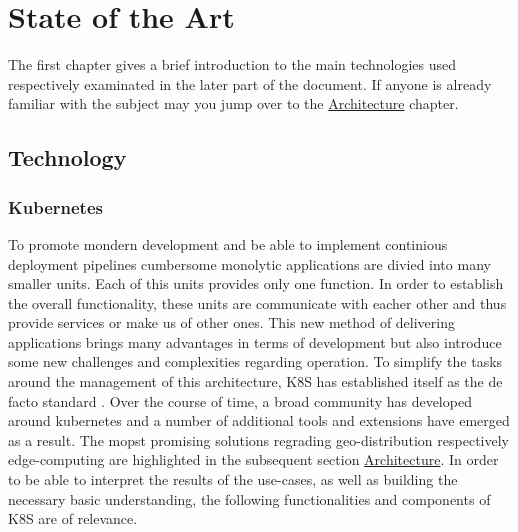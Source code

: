 \documentclass[MSC,Master,english]{twbook}%
\begin{document}
\chapter{State of the Art}
\label{chap:current}
The first chapter gives a brief introduction to the main technologies used respectively examinated in the later part of the document. If anyone is already familiar with the subject may you jump over to the \hyperref[sec:architecture]{Architecture} chapter.
\section{Technology}
\label{sec:technology}
\subsection{Kubernetes}
To promote mondern development and be able to implement continious deployment pipelines cumbersome monolytic applications are divied into many smaller units. Each of this units provides only one function. In order to establish the overall functionality, these units are communicate with eacher other and thus provide services or make us of other ones. This new method of delivering applications brings many advantages in terms of development but also introduce some new challenges and complexities regarding operation. To simplify the tasks around the management of this architecture, \ac{K8S} has established itself as the de facto standard \cite{k8ssurv}. Over the course of time, a broad community has developed around kubernetes and a number of additional tools and extensions have emerged as a result. The mopst promising solutions regrading geo-distribution respectively edge-computing are highlighted in the subsequent section \hyperref[sec:architecture]{Architecture}. In order to be able to interpret the results of the use-cases, as well as building the necessary basic understanding, the following functionalities and components of \ac{K8S} are of relevance.
\end{document}
